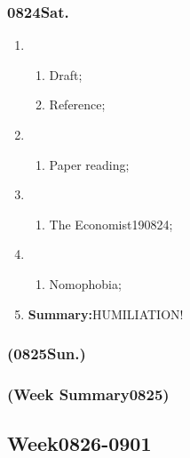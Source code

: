 \subsubsection{0824Sat.}
\begin{enumerate}
	\item \ncquaone
	\begin{enumerate}[(1)]
		\item Draft;\rightundoneBlack
		\item Reference;\rightundoneBlack
	\end{enumerate}
	
	\item \ncquatwo	
	\begin{enumerate}[(1)]
		\item Paper reading;\rightundoneBlack
	\end{enumerate}
	
	\item \ncquathree
	\begin{enumerate}[(1)]
		\item The Economist190824;\rightundoneBlack
	\end{enumerate}
	
	\item \ncquafour	
	\begin{enumerate}[(1)]
		\item Nomophobia;\rightundoneBlack
	\end{enumerate}
	\item \textbf{Summary:}HUMILIATION! 
\end{enumerate}
\subsubsection{(0825Sun.)}
\subsubsection{(Week Summary0825)}	 
\subsection{Week0826-0901} 
